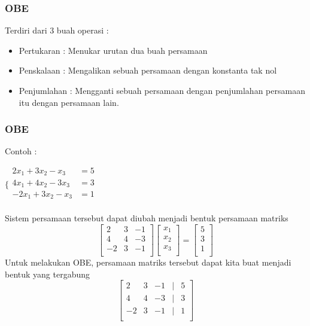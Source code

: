 \documentclass{beamer}
\begin{document}

\begin{frame}
\frametitle{OBE}
Terdiri dari 3 buah operasi :
\begin{itemize}
\item Pertukaran : Menukar urutan dua buah persamaan
\item Penskalaan : Mengalikan sebuah persamaan dengan konstanta tak nol
\item Penjumlahan : Mengganti sebuah persamaan dengan penjumlahan persamaan itu dengan persamaan lain.
\end{itemize}
\end{frame}


\begin{frame}
\frametitle{OBE}
Contoh :
\begin{center}
$\Biggl\{\begin{matrix}
	2x_1+3x_2-x_3 & =5\\
	4x_1+4x_2-3x_3 & =3\\
	-2x_1+3x_2-x_3 & =1\\
\end{matrix}$
\end{center}
Sistem persamaan tersebut dapat diubah menjadi bentuk persamaan matriks
\begin{equation}
\begin{bmatrix}
	2 & 3 & -1\\
	4 & 4 & -3\\
	-2 & 3 & -1\\
\end{bmatrix}
\begin{bmatrix}
	x_1\\
	x_2\\
	x_3\\
\end{bmatrix}=
\begin{bmatrix}
	5\\
	3\\
	1\\
\end{bmatrix}
\nonumber
\end{equation}
Untuk melakukan OBE, persamaan matriks tersebut dapat kita buat menjadi bentuk yang tergabung
\begin{equation}
\begin{bmatrix}
	2 & 3 & -1 &| &5\\
	4 & 4 & -3&| &3\\
	-2 & 3 & -1&| &1\\
\end{bmatrix}
\nonumber
\end{equation}

\end{frame}
\end{document}
